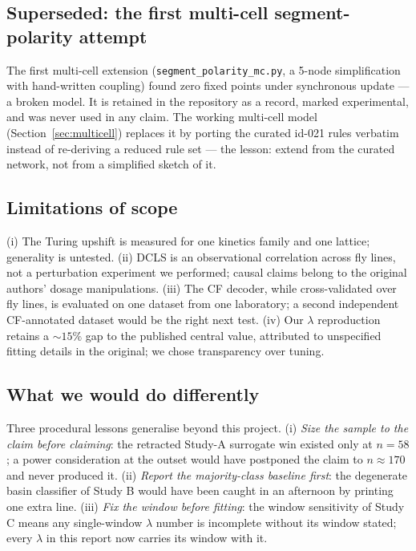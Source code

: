 \subsection{Superseded: the first multi-cell segment-polarity attempt}

The first multi-cell extension (\texttt{segment\_polarity\_mc.py}, a 5-node
simplification with hand-written coupling) found zero fixed points under
synchronous update --- a broken model. It is retained in the repository as a
record, marked experimental, and was never used in any claim. The working
multi-cell model (Section~\ref{sec:multicell}) replaces it by porting the
curated id-021 rules verbatim instead of re-deriving a reduced rule set ---
the lesson: extend from the curated network, not from a simplified sketch of
it.

\subsection{Limitations of scope}

(i) The Turing upshift is measured for one kinetics family and one lattice;
generality is untested. (ii) DCLS is an observational correlation across fly
lines, not a perturbation experiment we performed; causal claims belong to
the original authors' dosage manipulations. (iii) The CF decoder, while
cross-validated over fly lines, is evaluated on one dataset from one
laboratory; a second independent CF-annotated dataset would be the right
next test. (iv) Our $\lambda$ reproduction retains a $\sim 15\%$ gap to the
published central value, attributed to unspecified fitting details in the
original; we chose transparency over tuning.

\subsection{What we would do differently}

Three procedural lessons generalise beyond this project. (i) \emph{Size the
sample to the claim before claiming}: the retracted Study-A surrogate win
existed only at $n = 58$; a power consideration at the outset would have
postponed the claim to $n \approx 170$ and never produced it. (ii)
\emph{Report the majority-class baseline first}: the degenerate basin
classifier of Study B would have been caught in an afternoon by printing one
extra line. (iii) \emph{Fix the window before fitting}: the window
sensitivity of Study C means any single-window $\lambda$ number is
incomplete without its window stated; every $\lambda$ in this report now
carries its window with it.
